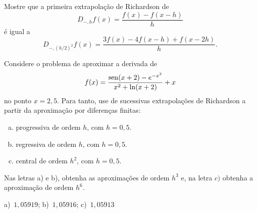 \begin{exer}
  Mostre que a primeira extrapolação de Richardson de
  \begin{equation}
    D_{-,h}f(x) = \frac{f(x)-f(x-h)}{h}
  \end{equation}
é igual a
\begin{equation}
  D_{-,(h/2)^2}f(x) = \frac{3f(x)-4f(x-h)+f(x-2h)}{h}.
\end{equation}
\end{exer}

\begin{exer}\label{exer:df_fun}
  Considere o problema de aproximar a derivada de 
  \begin{equation}
    f(x) = \frac{\operatorname{sen}(x+2) - e^{-x^2}}{x^2 + \ln(x+2)}+x
  \end{equation}
no ponto $x=2,5$. Para tanto, use de sucessivas extrapolações de Richardson a partir da aproximação por diferenças finitas:
\begin{enumerate}[a)]
\item progressiva de ordem $h$, com $h=0,5$.
\item regressiva de ordem $h$, com $h=0,5$.
\item central de ordem $h^2$, com $h=0,5$.
\end{enumerate}
Nas letras a) e b), obtenha as aproximações de ordem $h^3$ e, na letra $c)$ obtenha a aproximação de ordem $h^6$.
\end{exer}
\begin{resp}
  a)~$1,05919$; b)~$1,05916$; c)~$1,05913$
\end{resp}
